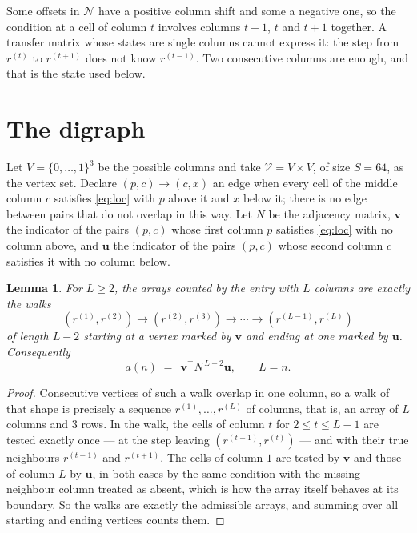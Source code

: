 \documentclass[11pt,a4paper]{article}
\theoremstyle{plain}
\newtheorem{lemma}[theorem]{Lemma}
\theoremstyle{definition}
\begin{document}
Some offsets in $\mathcal N$ have a positive column shift and some a negative one, so the
condition at a cell of column $t$ involves columns $t-1$, $t$ and $t+1$ together. A transfer
matrix whose states are single columns cannot express it: the step from $r^{(t)}$ to
$r^{(t+1)}$ does not know $r^{(t-1)}$. Two consecutive columns are enough, and that is
the state used below.

\section{The digraph}

Let $V=\{0,\dots,1\}^{3}$ be the possible columns and take
$\mathcal V=V\times V$, of size $S=64$, as the vertex set. Declare $(p,c)\to(c,x)$ an edge
when every cell of the middle column $c$ satisfies \eqref{eq:loc} with $p$ above it and $x$
below it; there is no edge between pairs that do not overlap in this way. Let $N$ be the
adjacency matrix, $\mathbf{v}$ the indicator of the pairs $(p,c)$ whose first column $p$
satisfies \eqref{eq:loc} with no column above, and $\mathbf{u}$ the indicator of
the pairs $(p,c)$ whose second column $c$ satisfies it with no column below.

\begin{lemma}\label{lem:walk}
For $L\ge2$, the arrays counted by the entry with $L$ columns are exactly the walks
\[
(r^{(1)},r^{(2)})\to(r^{(2)},r^{(3)})\to\cdots\to(r^{(L-1)},r^{(L)})
\]
of length $L-2$ starting at a vertex marked by $\mathbf{v}$ and ending at one marked by
$\mathbf{u}$. Consequently
\[
a(n)\;=\;\,\mathbf{v}^{\!\top}N^{\,L-2}\mathbf{u},\qquad L=n .
\]
\end{lemma}

\begin{proof}
Consecutive vertices of such a walk overlap in one column, so a walk of that shape is
precisely a sequence $r^{(1)},\dots,r^{(L)}$ of columns, that is, an array of $L$ columns
and $3$ rows. In the walk, the cells of column $t$ for $2\le t\le L-1$ are tested
exactly once --- at the step leaving $(r^{(t-1)},r^{(t)})$ --- and with their true
neighbours $r^{(t-1)}$ and $r^{(t+1)}$. The cells of column $1$ are tested by
$\mathbf{v}$ and those of column $L$ by $\mathbf{u}$, in both cases by the same condition
with the missing neighbour column treated as absent, which is how the array itself behaves at
its boundary. So the walks are exactly the admissible arrays, and summing over all starting
and ending vertices counts them.
\end{proof}
\end{document}
